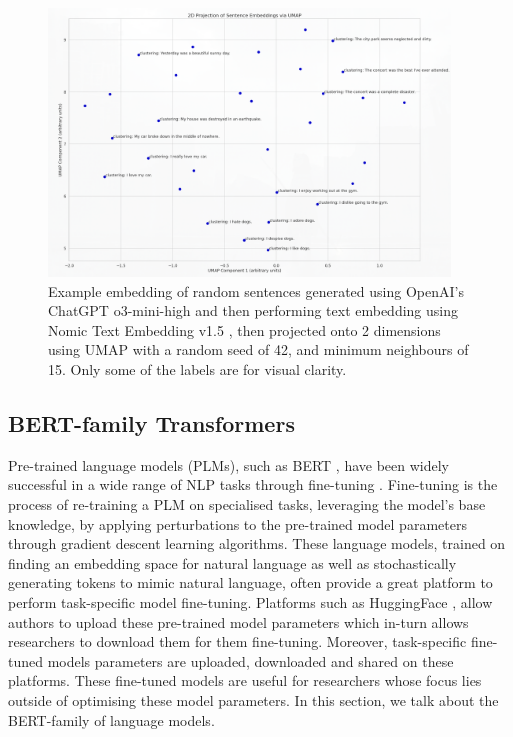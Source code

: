 \documentclass[10pt,oneside]{report}
\begin{document}
\begin{figure}[htbp]
    \centering
    \includegraphics[width=0.95\textwidth]{sentenceEmbeddingExample.png}
    \caption{Example embedding of random sentences generated using OpenAI's ChatGPT o3-mini-high and then performing text embedding using Nomic Text Embedding v1.5 \cite{nussbaum2024nomic}, then projected onto 2 dimensions using UMAP with a random seed of 42, and minimum neighbours of 15. Only some of the labels are for visual clarity.}\label{fig:sentenceEmbeddingExample}
\end{figure}

\subsection{BERT-family Transformers}\label{sec:BERT}
Pre-trained language models (PLMs), such as BERT \cite{devlin2019bert}, have been widely successful in a wide range of NLP tasks through fine-tuning \cite{edunov2019pre, min2023recent}. Fine-tuning is the process of re-training a PLM on specialised tasks, leveraging the model's base knowledge, by applying perturbations to the pre-trained model parameters through gradient descent learning algorithms. These language models, trained on finding an embedding space for natural language as well as stochastically generating tokens to mimic natural language, often provide a great platform to perform task-specific model fine-tuning. 
Platforms such as HuggingFace \cite{wolf2019huggingface}, allow authors to upload these pre-trained model parameters which in-turn allows researchers to download them for them fine-tuning. Moreover, task-specific fine-tuned models parameters are uploaded, downloaded and shared on these platforms. These fine-tuned models are useful for researchers whose focus lies outside of optimising these model parameters.
In this section, we talk about the BERT-family of language models.
\end{document}
